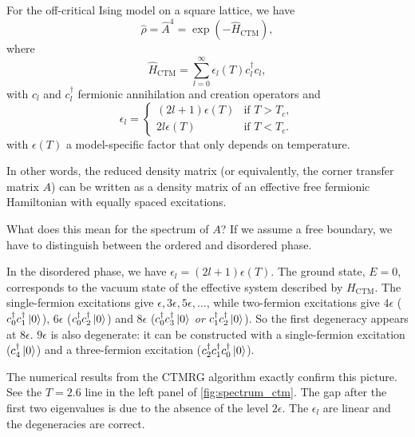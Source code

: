 For the off-critical Ising model on a square lattice, we have \cite{davies1988corner}
\begin{equation}\label{eq:rho_exact_expression_off_critical}
  \hat{\rho} = \hat{A}^4 = \exp(-\hat{H}_{\text{CTM}}),
\end{equation}
where
\begin{equation}
  \hat{H}_{\text{CTM}} = \sum_{l = 0}^{\infty} \epsilon_l(T) c^{\dagger}_l c_l,
\end{equation}
with $c_l$ and $c^{\dagger}_l$ fermionic annihilation and creation operators and
\begin{equation}
  \epsilon_l =
  \begin{cases}
    (2l + 1)\epsilon(T) & \text{if } T > T_c, \\
    2l\epsilon(T) & \text{if } T < T_c.
  \end{cases}
\end{equation}
with $\epsilon(T)$ a model-specific factor that only depends on temperature.

In other words, the reduced density matrix (or equivalently, the corner transfer matrix $A$) can be written as a
density matrix of an effective free fermionic Hamiltonian with equally spaced excitations.

What does this mean for the spectrum of $A$?
If we assume a free boundary, we have to distinguish between the ordered and disordered phase.

In the disordered phase, we have $\epsilon_l = (2l + 1)\epsilon(T)$.
The ground state, $E = 0$, corresponds to the vacuum state of the effective system described by $H_{\text{CTM}}$.
The single-fermion excitations give $\epsilon, 3\epsilon, 5\epsilon,
\dots$, while two-fermion excitations give $4\epsilon$ ($c^{\dagger}_0 c^{\dagger}_1 \ket{0}$),
$6\epsilon$ ($c^{\dagger}_0 c^{\dagger}_2 \ket{0}$) and $8\epsilon$ ($c^{\dagger}_0 c^{\dagger}_3 \ket{0}$ \emph{or}
$c^{\dagger}_1 c^{\dagger}_2 \ket{0}$).
So the first degeneracy appears at $8\epsilon$.
$9\epsilon$ is also degenerate:
it can be constructed with a single-fermion excitation ($ c^{\dagger}_4 \ket{0} $) and a three-fermion
excitation ($ c^{\dagger}_2 c^{\dagger}_1 c^{\dagger}_0 \ket{0} $).

The numerical results from the CTMRG algorithm exactly confirm this picture.
See the $T = 2.6$ line in the left panel of \autoref{fig:spectrum_ctm}. The gap after the first two eigenvalues is due
to the absence of the level $2\epsilon$. The $\epsilon_l$ are linear and the degeneracies are correct.

